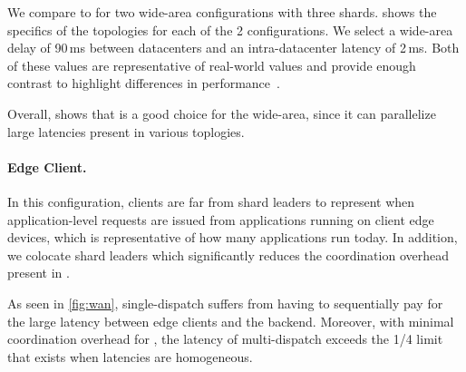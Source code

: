 

We compare \sys{} to \mpaxos{} for two wide-area configurations with three shards.
 shows the specifics of the topologies for each of the 2 configurations. We select a wide-area delay of 90\,ms between datacenters and an intra-datacenter latency of 2\,ms. Both of these values are representative of real-world values and provide enough contrast to highlight differences in performance~\cite{wanpings}.

Overall,  shows that \sys{} is a good choice for the wide-area, since it can parallelize large latencies present in various toplogies. 




\paragraph{Edge Client.}
In this configuration, clients are far from shard leaders to represent when application-level requests are issued from applications running on client edge devices, which is representative of how many applications run today. In addition, we colocate shard leaders which significantly reduces the coordination overhead present in \sys{}.

As seen in \cref{fig:wan}, single-dispatch suffers from having to sequentially pay for the large latency between edge clients and the backend. Moreover, with minimal coordination overhead for \sys{}, the latency of multi-dispatch exceeds the 1/4 limit that exists when latencies are homogeneous.

